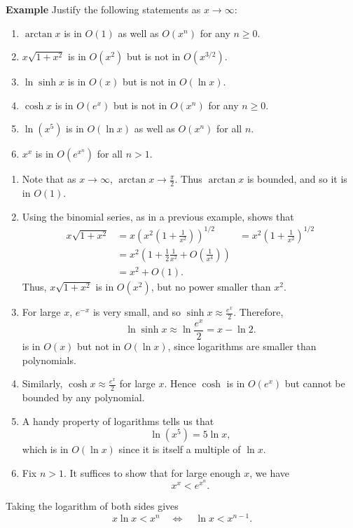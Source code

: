 \documentclass[twoside,openright,titlepage,a4paper]{book}
\begin{document}
\begin{sloppypar}
\textbf{Example} Justify the following statements as $x \rightarrow \infty$:
\begin{enumerate}
	\item $\arctan x$ is in $O(1)$ as well as $O(x^n)$ for any $n \geq 0$.
	\item $x \sqrt{1+x^2}$ is in $O(x^2)$ but is not in $O(x^{3/2})$.
	\item $\ln \sinh x$ is in $O(x)$ but is not in $O(\ln x)$.
	\item $\cosh x$ is in $O(e^x)$ but is not in $O(x^n)$ for any $n \geq 0$.
	\item $\ln (x^5)$ is in $O(\ln x)$ as well as $O(x^n)$ for all $n$.
	\item $x^x$ is in $O(e^{x^n})$ for all $n>1$.
\end{enumerate}
\begin{examplebox}
\begin{enumerate}
	\item Note that as $x \rightarrow \infty$, $\arctan x \rightarrow \frac{\pi}{2}$. Thus $\arctan x$ is bounded, and so it is in $O(1)$.
	\item Using the binomial series, as in a previous example, shows that
	\begin{align*}
	x \sqrt{1 + x^2} &= x \left(x^2\left(1+ \frac{1}{x^2}\right)\right)^{1/2} 
	&= x^2 \left(1+ \frac{1}{x^2}\right)^{1/2} \\
	&= x^2 \left( 1 + \frac{1}{2}\frac{1}{x^2} + O\left(\frac{1}{x^4}\right) \right) \\
	&= x^2 + O(1). 
	\end{align*}
	Thus, $x \sqrt{1+x^2}$ is in $O(x^2)$, but no power smaller than $x^2$.
	\item For large $x$, $e^{-x}$ is very small, and so $\sinh x \approx \frac{e^x}{2}$. Therefore, \[ \ln \sinh x \approx \ln \frac{e^x}{2} = x - \ln 2. \] is in $O(x)$ but not in $O(\ln x)$, since logarithms are smaller than polynomials.
	\item Similarly, $\cosh x \approx \frac{e^x}{2}$ for large $x$. Hence $\cosh$ is in $O(e^x)$ but cannot be bounded by any polynomial.
	\item A handy property of logarithms tells us that \[ \ln (x^5) = 5 \ln x, \] which is in $O(\ln x)$ since it is itself a multiple of $\ln x$.
	\item Fix $n>1$. It suffices to show that for large enough $x$, we have \[ x^x < e^{x^n}. \]
\end{enumerate}
Taking the logarithm of both sides gives \[ x \ln x < x^n \quad \Leftrightarrow \quad \ln x < x^{n-1}. \]


\end{examplebox}
\end{sloppypar}
\end{document}
